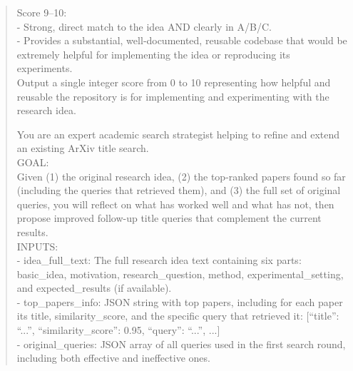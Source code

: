 \begin{quote}
\begin{tcolorbox}[breakable,colback=search!20!white, colframe=search!60!black, title=\textbf{Prompt for Search Agent (Search Results Scoring - Code)}]
        Score 9–10:\\
        - Strong, direct match to the idea AND clearly in A/B/C.\\
        - Provides a substantial, well‑documented, reusable codebase that would be extremely helpful for implementing the idea or reproducing its experiments.\\

        Output a single integer score from 0 to 10 representing how helpful and reusable the repository is for implementing and experimenting with the research idea.
    \end{tcolorbox}

    \begin{tcolorbox}[breakable,colback=search!20!white, colframe=search!60!black, title=\textbf{Prompt for Search Agent (Query Refinement - Literature)}]
    \label{app:prompt_query_refine_literature}
        You are an expert academic search strategist helping to refine and extend an existing ArXiv title search.\\

        GOAL:\\
        Given (1) the original research idea, (2) the top-ranked papers found so far (including the queries that retrieved them), and (3) the full set of original queries, you will reflect on what has worked well and what has not, then propose improved follow-up title queries that complement the current results.\\

        INPUTS:\\
        - idea\_full\_text: The full research idea text containing six parts: basic\_idea, motivation, research\_question, method, experimental\_setting, and expected\_results (if available).\\
        - top\_papers\_info: JSON string with top papers, including for each paper its title, similarity\_score, and the specific query that retrieved it: [{``title'': ``...'', ``similarity\_score'': 0.95, ``query'': ``...''}, ...]\\
        - original\_queries: JSON array of all queries used in the first search round, including both effective and ineffective ones.\\


\end{tcolorbox}
\end{quote}
